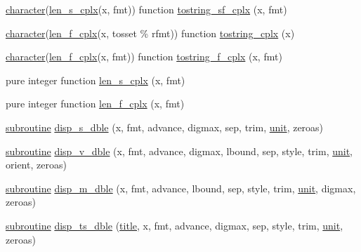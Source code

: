 \begin{DoxyCompactItemize}
\item 
\hyperlink{option__stopwatch_83_8txt_abd4b21fbbd175834027b5224bfe97e66}{character}(\hyperlink{namespacem__display_a7b573fb0cba7c7c954a820cdfe1c7968}{len\+\_\+s\+\_\+cplx}(x, fmt)) function \hyperlink{namespacem__display_a2a7022ce15edf03ceccb423e9da40c87}{tostring\+\_\+sf\+\_\+cplx} (x, fmt)
\item 
\hyperlink{option__stopwatch_83_8txt_abd4b21fbbd175834027b5224bfe97e66}{character}(\hyperlink{namespacem__display_a37f268a7276f14d4975200a8f83acff3}{len\+\_\+f\+\_\+cplx}(x, tosset \% rfmt)) function \hyperlink{namespacem__display_a1b05d11dd12d88ce00f912751be126f3}{tostring\+\_\+cplx} (x)
\item 
\hyperlink{option__stopwatch_83_8txt_abd4b21fbbd175834027b5224bfe97e66}{character}(\hyperlink{namespacem__display_a37f268a7276f14d4975200a8f83acff3}{len\+\_\+f\+\_\+cplx}(x, fmt)) function \hyperlink{namespacem__display_af19de6a6efe76fa3dc9bd86a33f9321b}{tostring\+\_\+f\+\_\+cplx} (x, fmt)
\item 
pure integer function \hyperlink{namespacem__display_a7b573fb0cba7c7c954a820cdfe1c7968}{len\+\_\+s\+\_\+cplx} (x, fmt)
\item 
pure integer function \hyperlink{namespacem__display_a37f268a7276f14d4975200a8f83acff3}{len\+\_\+f\+\_\+cplx} (x, fmt)
\item 
\hyperlink{M__stopwatch_83_8txt_acfbcff50169d691ff02d4a123ed70482}{subroutine} \hyperlink{namespacem__display_a8462e9d78a29a0658777c7af9eabd28c}{disp\+\_\+s\+\_\+dble} (x, fmt, advance, digmax, sep, trim, \hyperlink{M__stopwatch_83_8txt_a5cbef30eb7c0d734bd82f5a7ebea9aa7}{unit}, zeroas)
\item 
\hyperlink{M__stopwatch_83_8txt_acfbcff50169d691ff02d4a123ed70482}{subroutine} \hyperlink{namespacem__display_ab4f1149ffdc3afbc851bfc62ce4a55aa}{disp\+\_\+v\+\_\+dble} (x, fmt, advance, digmax, lbound, sep, style, trim, \hyperlink{M__stopwatch_83_8txt_a5cbef30eb7c0d734bd82f5a7ebea9aa7}{unit}, orient, zeroas)
\item 
\hyperlink{M__stopwatch_83_8txt_acfbcff50169d691ff02d4a123ed70482}{subroutine} \hyperlink{namespacem__display_a0654623dfa7d590274102bc029c96a8f}{disp\+\_\+m\+\_\+dble} (x, fmt, advance, lbound, sep, style, trim, \hyperlink{M__stopwatch_83_8txt_a5cbef30eb7c0d734bd82f5a7ebea9aa7}{unit}, digmax, zeroas)
\item 
\hyperlink{M__stopwatch_83_8txt_acfbcff50169d691ff02d4a123ed70482}{subroutine} \hyperlink{namespacem__display_ae661abeb19eae92ba50504a58d7c8c26}{disp\+\_\+ts\+\_\+dble} (\hyperlink{print__watch_83_8txt_a15b5bd21156bb9fca6a755ab8c029a9c}{title}, x, fmt, advance, digmax, sep, style, trim, \hyperlink{M__stopwatch_83_8txt_a5cbef30eb7c0d734bd82f5a7ebea9aa7}{unit}, zeroas)

\end{DoxyCompactItemize}
